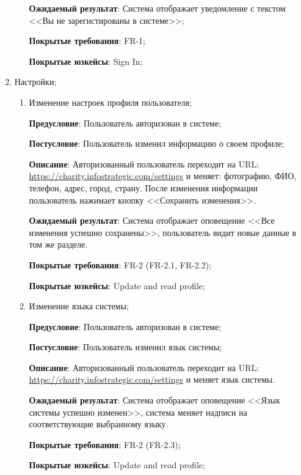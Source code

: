 \begin{enumerate}
\begin{enumerate}
        \textbf{Ожидаемый результат}: Система отображает уведомление с текстом <<Вы не зарегистированы в системе>>;
        
        \textbf{Покрытые требования}: FR-1;
        
        \textbf{Покрытые юзкейсы}: Sign In;
    \end{enumerate}
    
    \item Настройки;
    \begin{enumerate}
        \item Изменение настроек профиля пользователя;
        
        \textbf{Предусловие}: Пользователь авторизован в системе;
        
        \textbf{Постусловие}: Пользователь изменил информацию о своем профиле;
        
        \textbf{Описание}: Авторизованный пользователь переходит на URL: \url{https://charity.infostrategic.com/settings} и меняет: фотографию, ФИО, телефон, адрес, город, страну. После изменения информации пользователь нажимает кнопку <<Сохранить изменения>>.
        
        \textbf{Ожидаемый результат}: Система отображает оповещение <<Все изменения успешно сохранены>>, пользователь видит новые данные в том же разделе.
        
        \textbf{Покрытые требования}: FR-2 (FR-2.1, FR-2.2);
        
        \textbf{Покрытые юзкейсы}: Update and read profile;
        
        \item Изменение языка системы;
        
        \textbf{Предусловие}: Пользователь авторизован в системе;
        
        \textbf{Постусловие}: Пользователь изменил язык системы;
        
        \textbf{Описание}: Авторизованный пользователь переходит на URL: \url{https://charity.infostrategic.com/settings} и меняет язык системы.
        
        \textbf{Ожидаемый результат}: Система отображает оповещение <<Язык системы успешно изменен>>, система меняет надписи на соответствующие выбранному языку.
        
        \textbf{Покрытые требования}: FR-2 (FR-2.3);
        
        \textbf{Покрытые юзкейсы}: Update and read profile;
    \end{enumerate}
    

\end{enumerate}
